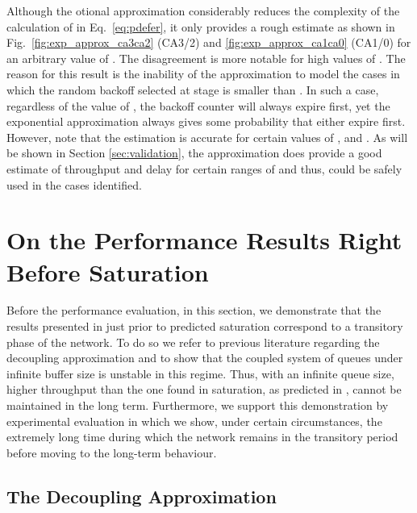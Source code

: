 \documentclass[preprint,12pt]{elsarticle}
\begin{document}
Although the otional approximation considerably reduces the complexity of the calculation of  in Eq.~\ref{eq:pdefer}, it only provides a rough estimate as shown in Fig.~\ref{fig:exp_approx_ca3ca2} (CA3/2) and \ref{fig:exp_approx_ca1ca0} (CA1/0) for an arbitrary value of . The disagreement is more notable for high values of . The reason for this result is the inability of the approximation to model the cases in which the random backoff selected at stage  is smaller than . In such a case, regardless of the value of , the backoff counter will always expire first, yet the exponential approximation always gives some probability that either expire first. However, note that the estimation is accurate for certain values of ,  and . As will be shown in Section \ref{sec:validation}, the approximation does provide a good estimate of throughput and delay for certain ranges of  and thus, could be safely used in the cases identified.

\section{On the Performance Results Right Before Saturation}\label{sec:demonstration}

Before the performance evaluation, in this section, we demonstrate that the results presented in \cite{chung2006performance} just prior to predicted saturation correspond to a transitory phase of the network. To do so we refer to previous literature regarding the decoupling approximation and to show that the coupled system of queues under infinite buffer size is unstable in this regime. Thus, with an infinite queue size, higher throughput than the one found in saturation, as predicted in \cite{chung2006performance}, cannot be maintained in the long term. Furthermore, we support this demonstration by experimental evaluation in which we show, under certain circumstances, the extremely long time during which the network remains in the transitory period before moving to the long-term behaviour. 


\subsection{The Decoupling Approximation}
\end{document}
